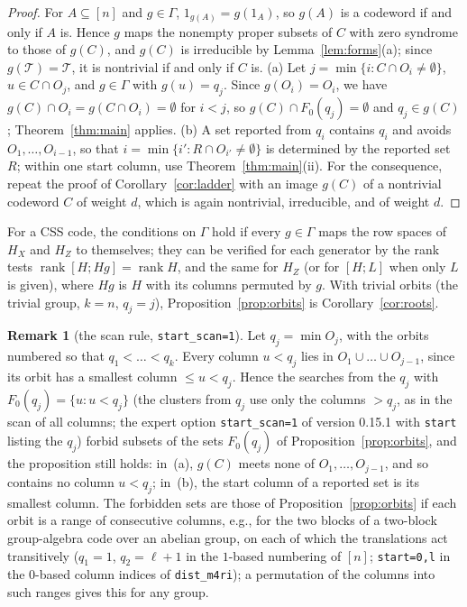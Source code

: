 \documentclass[11pt]{article}
\theoremstyle{definition}
\newtheorem{remark}[theorem]{Remark}
\DeclareMathOperator{\rank}{rank}
\newcommand{\Tr}{\mathcal{T}}   %
\newcommand{\ttt}[1]{\texttt{#1}}
\begin{document}
\begin{proof}
For $A\subseteq[n]$ and $g\in\Gamma$, $1_{g(A)}=g(1_A)$, so $g(A)$ is a codeword if and only if $A$ is. Hence $g$
maps the nonempty proper subsets of $C$ with zero syndrome to those of $g(C)$, and $g(C)$ is irreducible by
Lemma~\ref{lem:forms}(a); since $g(\Tr)=\Tr$, it is nontrivial if and only if $C$ is.
(a) Let $j=\min\{i:C\cap O_i\neq\emptyset\}$, $u\in C\cap O_j$, and $g\in\Gamma$ with $g(u)=q_j$. Since
$g(O_i)=O_i$, we have $g(C)\cap O_i=g(C\cap O_i)=\emptyset$ for $i<j$, so $g(C)\cap F_0(q_j)=\emptyset$ and
$q_j\in g(C)$; Theorem~\ref{thm:main} applies.
(b) A set reported from $q_i$ contains $q_i$ and avoids $O_1,\dots,O_{i-1}$, so that $i=\min\{i':R\cap O_{i'}\neq
\emptyset\}$ is determined by the reported set $R$; within one start column, use Theorem~\ref{thm:main}(ii).
For the consequence, repeat the proof of Corollary~\ref{cor:ladder} with an image $g(C)$ of a nontrivial codeword $C$
of weight $d$, which is again nontrivial, irreducible, and of weight $d$.
\end{proof}

For a CSS code, the conditions on $\Gamma$ hold if every $g\in\Gamma$ maps the row spaces of $H_X$ and $H_Z$ to
themselves; they can be verified for each generator by the rank tests $\rank[H;Hg]=\rank H$, and the same for $H_Z$
(or for $[H;L]$ when only $L$ is given), where $Hg$ is $H$ with its columns permuted by $g$. With trivial orbits (the
trivial group, $k=n$, $q_j=j$), Proposition~\ref{prop:orbits} is Corollary~\ref{cor:roots}.

\begin{remark}[the scan rule, \ttt{start\_scan=1}]\label{rem:scan}
Let $q_j=\min O_j$, with the orbits numbered so that $q_1<\dots<q_k$. Every column $u<q_j$ lies in
$O_1\cup\dots\cup O_{j-1}$, since its orbit has a smallest column $\le u<q_j$. Hence the searches from the $q_j$ with
$F_0(q_j)=\{u:u<q_j\}$ (the clusters from $q_j$ use only the columns $>q_j$, as in the scan of all columns; the
expert option \ttt{start\_scan=1} of version 0.15.1 with \ttt{start} listing the $q_j$) forbid subsets of the sets
$F_0(q_j)$ of Proposition~\ref{prop:orbits}, and the proposition still holds: in~(a), $g(C)$ meets none of
$O_1,\dots,O_{j-1}$, and so contains no column $u<q_j$; in~(b), the start column of a reported set is its smallest
column. The forbidden sets are those of Proposition~\ref{prop:orbits} if each orbit is a range of consecutive columns,
e.g., for the two blocks of a two-block group-algebra code over an abelian group, on each of which the translations act
transitively ($q_1=1$, $q_2=\ell+1$ in the $1$-based numbering of $[n]$; \ttt{start=0,l} in the $0$-based column
indices of \ttt{dist\_m4ri}); a permutation of the columns into such ranges gives this for any group.
\end{remark}
\end{document}

